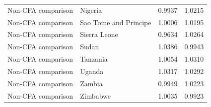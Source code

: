 \begin{table}
\begin{tabular}[t]{llrr}
Non-CFA comparison & Nigeria & 0.9937 & 1.0215\\
Non-CFA comparison & Sao Tome and Principe & 1.0006 & 1.0195\\
Non-CFA comparison & Sierra Leone & 0.9634 & 1.0264\\
\addlinespace
Non-CFA comparison & Sudan & 1.0386 & 0.9943\\
Non-CFA comparison & Tanzania & 1.0054 & 1.0310\\
Non-CFA comparison & Uganda & 1.0317 & 1.0292\\
Non-CFA comparison & Zambia & 0.9949 & 1.0223\\
Non-CFA comparison & Zimbabwe & 1.0035 & 0.9923\\
\bottomrule
\end{tabular}
\end{table}